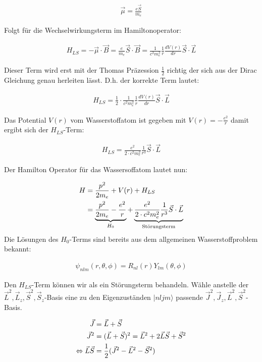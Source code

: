 \begin{align}
  \label{eq:4}
  \vec \mu = \frac{e\vec S}{m_e}
\end{align}

Folgt für die Wechselwirkungsterm im Hamiltonoperator:

\begin{align}
  \label{eq:5}
  H_{LS} = -\vec\mu\cdot\vec B = \frac{e}{m_e}\vec S\cdot\vec B =  \frac{1}{c^2 m_e^2}\frac{1}{r} \frac{dV(r)}{dr}\vec S\cdot \vec L
\end{align}

Dieser Term wird erst mit der Thomas Präzession \(\frac{1}{2}\) richtig der sich aus der Dirac Gleichung genau herleiten lässt. D.h. der korrekte Term lautet:

\begin{align}
  \label{eq:6}
  \boxed{H_{LS} = \frac{1}{2}\cdot\frac{1}{c^2 m_e^2}\frac{1}{r} \frac{dV(r)}{dr}\vec S\cdot \vec L}
\end{align}

Das Potential \(V(r)\) vom Wasserstoffatom ist gegeben mit \(V(r) = - \frac{e^2}{r}\) damit ergibt sich der \(H_{LS}\)-Term:

\begin{align}
  \label{eq:7}
  H_{LS} =  \frac{e^2}{2\cdot c^2 m_e^2}\frac{1}{r^3} \vec S\cdot \vec L
\end{align}

Der Hamilton Operator für das Wassersoffatom lautet nun:

\begin{align}
  \label{eq:8}
  H &= \frac{p^2}{2m_e} + V(r) + H_{LS}\notag \\
&= \underbrace{\frac{p^2}{2m_e} -\frac{e^2}{r}}_{H_0} + \underbrace{\frac{e^2}{2\cdot c^2 m_e^2}\frac{1}{r^3} \vec S\cdot \vec L}_{\text{Störungsterm}}
\end{align}
Die Lösungen des \(H_0\)-Terms sind bereits aus dem allgemeinen Wasserstoffproblem bekannt:

\begin{align}
  \label{eq:9}
  \psi_{nlm}(r,\theta,\phi) = R_{nl}(r)Y_{lm}(\theta,\phi)
\end{align}

Den \(H_{LS}\)-Term können wir als ein Störungsterm behandeln. Wähle anstelle der \(\vec L^2,\vec L_z,\vec S^2,\vec S_z\)-Basis eine zu den Eigenzuständen \(|nljm\rangle \)  passende \(\vec J^2,\vec J_z,\vec L^2,\vec S^2\)-Basis. 

\begin{align}
  \label{eq:10}
  \vec J &= \vec L + \vec S \notag \\
\vec J^2 &= (\vec L + \vec S)^2 = \vec L^2 + 2\vec L\vec S + \vec S^2\notag \\
\Leftrightarrow \vec L\vec S &= \frac{1}{2}(\vec J^2-\vec L^2-  \vec S^2)
\end{align}

